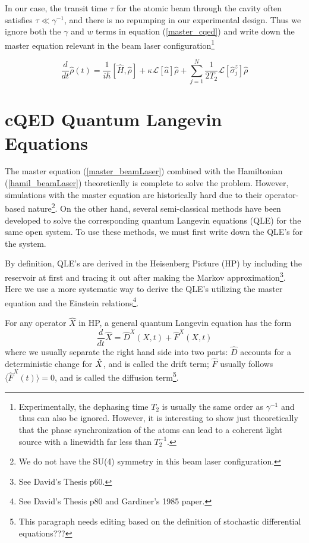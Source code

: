 \documentclass{article}
\newcommand{\lindblad}{\mathcal{L}}
\begin{document}
In our case, the transit time $\tau$ for the atomic beam through the cavity often satisfies $\tau \ll \gamma^{-1}$, and there is no repumping in our experimental design. Thus we ignore both the $\gamma$ and $w$ terms in equation (\ref{master_cqed}) and write down the master equation relevant in the beam laser configuration\footnote{Experimentally, the dephasing time $T_2$ is usually the same order as $\gamma^{-1}$ and thus can also be ignored. However, it is interesting to show just theoretically that the phase synchronization of the atoms can lead to a coherent light source with a linewidth far less than $T_2^{-1}$.}

\begin{equation}
\label{master_beamLaser}
\frac{d}{dt}\hat{\rho}(t)=\frac{1}{i\hbar}\left[\hat{H},\hat{\rho}\right]+\kappa\lindblad[\hat{a}]\hat{\rho}+\sum^{N}_{j=1}\frac{1}{2T_2}\lindblad[\hat{\sigma}^{z}_j]\hat{\rho}
\end{equation}


\section{cQED Quantum Langevin Equations}
The master equation (\ref{master_beamLaser}) combined with the Hamiltonian (\ref{hamil_beamLaser}) theoretically is complete to solve the problem. However, simulations with the master equation are historically hard due to their operator-based nature\footnote{We do not have the SU(4) symmetry in this beam laser configuration.}. On the other hand, several semi-classical methods have been developed to solve the corresponding quantum Langevin equations (QLE) for the same open system. To use these methods, we must first write down the QLE's for the system. 

By definition, QLE's are derived in the Heisenberg Picture (HP) by including the reservoir at first and tracing it out after making the Markov approximation\footnote{See David's Thesis p60.}. Here we use a more systematic way to derive the QLE's utilizing the master equation and the Einstein relations\footnote{See David's Thesis p80 and Gardiner's 1985 paper.}.

For any operator $\hat{X}$ in HP, a general quantum Langevin equation has the form
\begin{equation}
\label{qle}
    \frac{d}{dt}\hat{X} = \hat{D}^X(X,t) + \hat{F}^X(X,t)
\end{equation}
where we usually separate the right hand side into two parts: $\hat{D}$ accounts for a deterministic change for $\Hat{X}$, and is called the drift term; $\hat{F}$ usually follows $\langle \hat{F}^X(t) \rangle = 0$, and is called the diffusion term\footnote{This paragraph needs editing based on the definition of stochastic differential equations???}.
\end{document}
